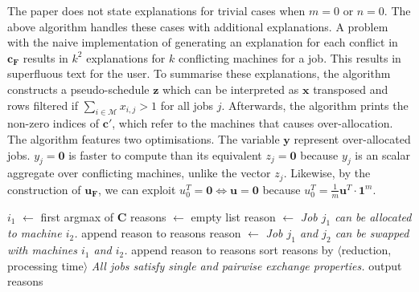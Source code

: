 The paper \cite{aes} does not state explanations for trivial cases when $m=0$ or $n=0$. The above algorithm handles these cases with additional explanations. A problem with the naive implementation of generating an explanation for each conflict in $\mathbf{c_F}$ results in $k^2$ explanations for $k$ conflicting machines for a job. This results in superfluous text for the user. To summarise these explanations, the algorithm constructs a pseudo-schedule $\mathbf{z}$ which can be interpreted as $\mathbf{x}$ transposed and rows filtered if $\sum_{i\in\mathcal{M}}x_{i,j}>1$ for all jobs $j$. Afterwards, the algorithm prints the non-zero indices of $\mathbf{c}'$, which refer to the machines that causes over-allocation.
\linespace
The algorithm features two optimisations. The variable $\mathbf{y}$ represent over-allocated jobs. $y_j=\mathbf{0}$ is faster to compute than its equivalent $z_j=\mathbf{0}$ because $y_j$ is an scalar aggregate over conflicting machines, unlike the vector $z_j$. Likewise, by the construction of $\mathbf{u_F}$, we can exploit $u^T_0=\mathbf{0}\iff\mathbf{u}=\mathbf{0}$ because $u^T_0=\frac{1}{m}\mathbf{u}^T\cdot\mathbf{1}^m$.

\begin{algorithm}[H]
	\caption{}
	\begin{algorithmic}[1]
						\State $i_1$ $\gets$ first argmax of $\mathbf{C}$
			\State reasons $\gets$ empty list
						\State reason $\gets$ \emph{Job $j_1$ can be allocated to machine $i_2$.}
						\State append reason to reasons
					\EndIf
							\State reason $\gets$ \emph{Job $j_1$ and $j_2$ can be swapped with machines $i_1$ and $i_2$.}
							\State append reason to reasons
						\EndIf
					\EndFor
				\EndFor
			\EndFor
			\State sort reasons by $\langle$reduction, processing time$\rangle$
				\State\emph{All jobs satisfy single and pairwise exchange properties.}
			\Else
				\State output reasons
			\EndIf
		\EndFunction
	\end{algorithmic}
\end{algorithm}


